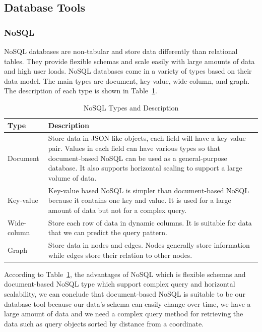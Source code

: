 \documentclass[12pt,oneside,openright,a4paper]{cpe-english-project}
\begin{document}
\subsection{Database Tools}

\subsubsection{NoSQL}

NoSQL databases are non-tabular and store data differently than relational tables. They provide flexible schemas and scale easily with large amounts of data and high user loads. NoSQL databases come in a variety of types based on their data model. The main types are document, key-value, wide-column, and graph. \cite{WhatisNoSQL} The description of each type is shown in Table~\ref{tbl:2NoSQLTypesandDescription}.

\begin{table}[H]
\caption{NoSQL Types and Description}\label{tbl:2NoSQLTypesandDescription}
\begin{tabularx}{\textwidth}{l|X} \hline\hline
Type & Description \\ \hline\hline
Document & Store data in JSON-like objects, each field will have a key-value pair. Values in each field can have various types so that document-based NoSQL can be used as a general-purpose database. It also supports horizontal scaling to support a large volume of data. \\ \hline
Key-value & Key-value based NoSQL is simpler than document-based NoSQL because it contains one key and value. It is used for a large amount of data but not for a complex query. \\ \hline
Wide-column & Store each row of data in dynamic columns. It is suitable for data that we can predict the query pattern. \\ \hline
Graph & Store data in nodes and edges. Nodes generally store information while edges store their relation to other nodes. \\ \hline\hline
\end{tabularx}
\end{table}

According to Table~\ref{tbl:2NoSQLTypesandDescription}, the advantages of NoSQL which is flexible schemas and document-based NoSQL type which support complex query and horizontal scalability, we can conclude that document-based NoSQL is suitable to be our database tool because our data’s schema can easily change over time, we have a large amount of data and we need a complex query method for retrieving the data such as query objects sorted by distance from a coordinate.
\end{document}
